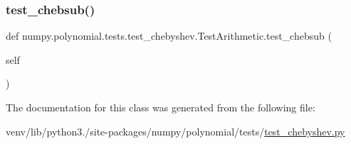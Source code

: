 \subsubsection{\texorpdfstring{test\+\_\+chebsub()}{test\_chebsub()}}
{\footnotesize\ttfamily def numpy.\+polynomial.\+tests.\+test\+\_\+chebyshev.\+Test\+Arithmetic.\+test\+\_\+chebsub (\begin{DoxyParamCaption}\item[{}]{self }\end{DoxyParamCaption})}



The documentation for this class was generated from the following file\+:\begin{DoxyCompactItemize}
\item 
venv/lib/python3./site-\/packages/numpy/polynomial/tests/\hyperlink{test__chebyshev_8py}{test\+\_\+chebyshev.\+py}\end{DoxyCompactItemize}
